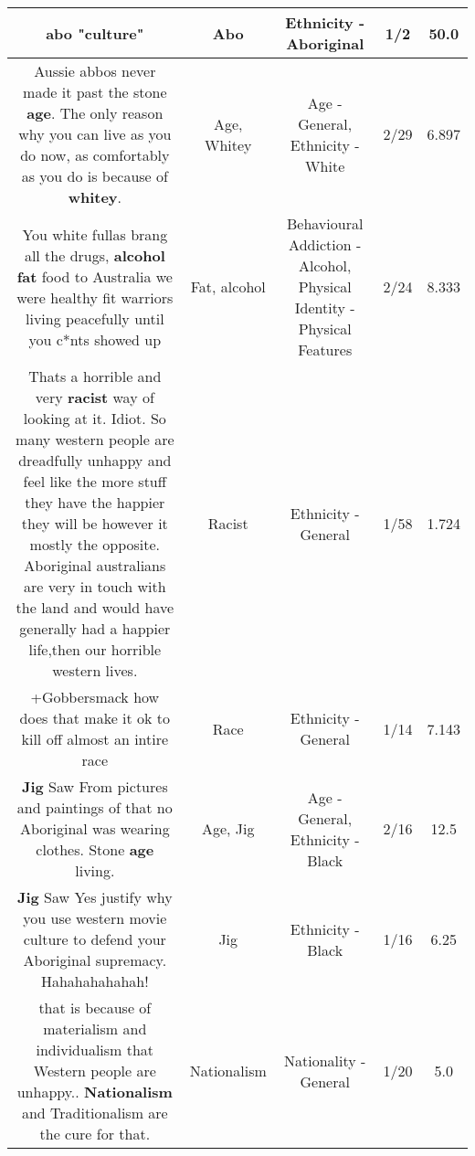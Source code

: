 \documentclass[11pt]{article}
\newlength\mylength
\begin{document}
\begin{center}
\begin{longtable}{|C{.65\mylength}|C{.30\mylength}|C{.12\mylength}|C{.12\mylength}|C{.12\mylength}|}
  \small abo "culture"\normalsize   & Abo & Ethnicity - Aboriginal & 1/2 & 50.0 \\  \hline
  \small Aussie abbos never made it past the stone \textbf{age}. The only reason why you can live as you do now, as comfortably as you do is because of \textbf{whitey}.\normalsize   & Age, Whitey & Age - General, Ethnicity - White & 2/29 & 6.897 \\  \hline
  \small You white fullas  brang all the drugs, \textbf{alcohol} \textbf{fat} food to Australia we were healthy fit warriors living peacefully until you c*nts showed up\normalsize   & Fat, alcohol & Behavioural Addiction - Alcohol, Physical Identity - Physical Features & 2/24 & 8.333 \\  \hline
  \small Thats a horrible and very \textbf{racist} way of looking at it. Idiot. So many western people are dreadfully unhappy and feel like the more stuff they have the happier they will be however it mostly the opposite. Aboriginal australians are very in touch with the land and would have generally had a happier life,then our horrible western lives.\normalsize   & Racist & Ethnicity - General & 1/58 & 1.724 \\  \hline
  \small +Gobbersmack how does that make it ok to kill off almost an intire race\normalsize   & Race & Ethnicity - General & 1/14 & 7.143 \\  \hline
  \small \@\textbf{Jig} Saw   From pictures and paintings of that no Aboriginal was wearing clothes. Stone \textbf{age} living.\normalsize   & Age, Jig & Age - General, Ethnicity - Black & 2/16 & 12.5 \\  \hline
  \small \@\textbf{Jig} Saw Yes justify why you use western movie culture to defend your Aboriginal supremacy.  Hahahahahahah!\normalsize   & Jig & Ethnicity - Black & 1/16 & 6.25 \\  \hline
  \small that is because of materialism and individualism that Western people are unhappy.. \textbf{Nationalism} and Traditionalism are the cure for that.\normalsize   & Nationalism & Nationality - General & 1/20 & 5.0 \\  \hline

\end{longtable}
\end{center}
\end{document}
